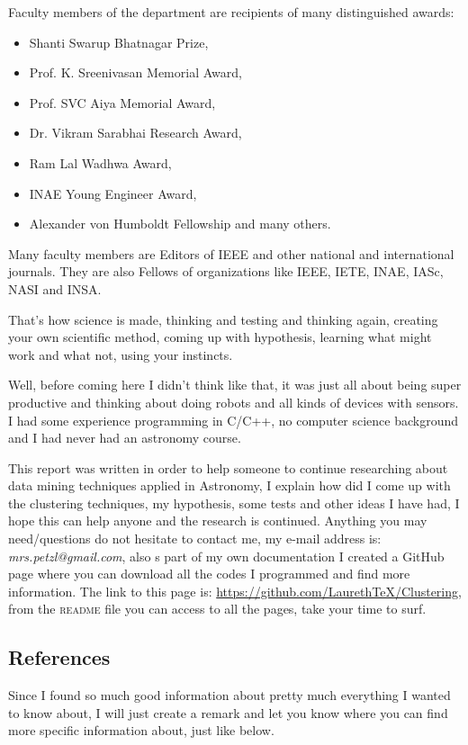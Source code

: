 \documentclass[11pt,fleqn]{book} %
\begin{document}
Faculty members of the department are recipients of many distinguished awards:
\begin{itemize}
	\item Shanti Swarup Bhatnagar Prize,
	\item Prof. K. Sreenivasan Memorial Award,
	\item Prof. SVC Aiya Memorial Award,
	\item Dr. Vikram Sarabhai Research Award,
	\item Ram Lal Wadhwa Award,
	\item INAE Young Engineer Award,
	\item Alexander von Humboldt Fellowship and many others.
\end{itemize}
Many faculty members are Editors of IEEE and other national and international journals. They
are also Fellows of organizations like IEEE, IETE, INAE, IASc, NASI and INSA.

That's how science is made, thinking and testing and thinking again, creating your own scientific method, coming up with hypothesis, learning what might work and what not, using your instincts. 

Well, before coming here I didn't think like that, it was just all about being super productive and thinking about doing robots and all kinds of devices with sensors. I had some experience programming in C/C++, no computer science background and I had never had an astronomy course.

This report was written in order to help someone to continue researching about data mining techniques applied in Astronomy, I explain how did I come up with the clustering techniques, my hypothesis, some tests and other ideas I have had, I hope this can help anyone and the research is continued. Anything you may need/questions do not hesitate to contact me, my e-mail address is: \emph{mrs.petzl@gmail.com}, also s part of my own documentation I created a GitHub page where you can download all the codes I programmed and find more information. The link to this page is: \url{https://github.com/LaurethTeX/Clustering}, from the \textsc{readme} file you can access to all the pages, take your time to surf.

\subsection{References}

Since I found so much good information about pretty much everything I wanted to know about, I will just create a remark and let you know where you can find more specific information about, just like below.
\end{document}
